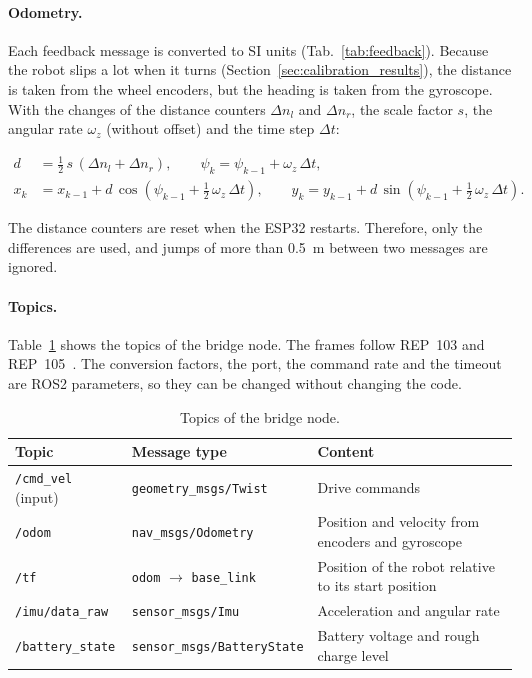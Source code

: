 \paragraph{Odometry.} Each feedback message is converted to SI units (Tab.~\ref{tab:feedback}). Because the robot slips a lot when it turns (Section~\ref{sec:calibration_results}), the distance is taken from the wheel encoders, but the heading is taken from the gyroscope. With the changes of the distance counters $\Delta n_l$ and $\Delta n_r$, the scale factor $s$, the angular rate $\omega_z$ (without offset) and the time step $\Delta t$:

\begin{align}
  d &= \tfrac{1}{2}\,s\,(\Delta n_l + \Delta n_r), \qquad \psi_k = \psi_{k-1} + \omega_z\,\Delta t, \\
  x_k &= x_{k-1} + d\,\cos\!\left(\psi_{k-1} + \tfrac{1}{2}\,\omega_z\,\Delta t\right), \qquad
  y_k = y_{k-1} + d\,\sin\!\left(\psi_{k-1} + \tfrac{1}{2}\,\omega_z\,\Delta t\right).
\end{align}

The distance counters are reset when the ESP32 restarts. Therefore, only the differences are used, and jumps of more than \SI{0.5}{\metre} between two messages are ignored.

\paragraph{Topics.} Table~\ref{tab:topics} shows the topics of the bridge node. The frames follow REP~103 and REP~105~\citep{rep103,rep105}. The conversion factors, the port, the command rate and the timeout are ROS2 parameters, so they can be changed without changing the code.

\begin{table}[H]
  \centering
  \small
  \caption{Topics of the bridge node.}
  \label{tab:topics}
  \begin{tabularx}{\textwidth}{@{}l l X@{}}
    \toprule
    \textbf{Topic} & \textbf{Message type} & \textbf{Content} \\
    \midrule
    \texttt{/cmd\_vel} (input) & \texttt{geometry\_msgs/Twist}       & Drive commands \\
    \texttt{/odom}             & \texttt{nav\_msgs/Odometry}         & Position and velocity from encoders and gyroscope \\
    \texttt{/tf}               & \texttt{odom} $\rightarrow$ \texttt{base\_link} & Position of the robot relative to its start position \\
    \texttt{/imu/data\_raw}    & \texttt{sensor\_msgs/Imu}           & Acceleration and angular rate \\
    \texttt{/battery\_state}   & \texttt{sensor\_msgs/BatteryState}  & Battery voltage and rough charge level \\
    \bottomrule
  \end{tabularx}
\end{table}

